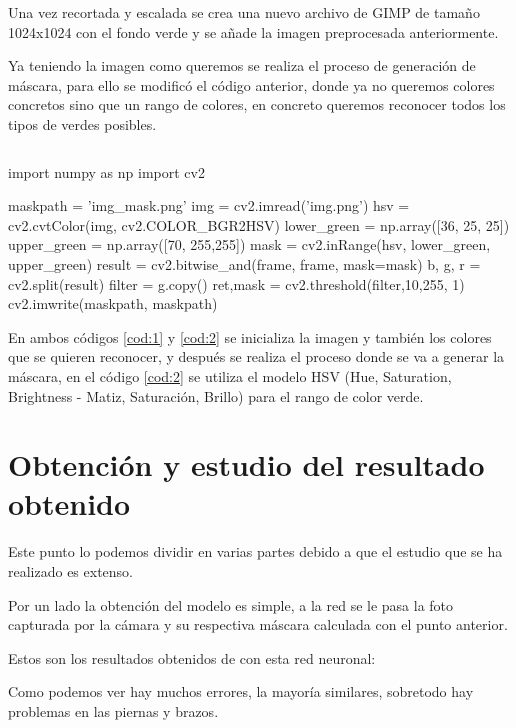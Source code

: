 Una vez recortada y escalada se crea una nuevo archivo de GIMP de tamaño 1024x1024 con el fondo verde y se añade la imagen preprocesada anteriormente.

Ya teniendo la imagen como queremos se realiza el proceso de generación de máscara, para ello se modificó el código anterior, donde ya no queremos colores concretos sino que un rango de colores, en concreto queremos reconocer todos los tipos de verdes posibles.
\pagebreak

\begin{lstlisting}[caption={Código obtención máscara 2}, label=cod:2]
\end{lstlisting}
\begin{python}
	import numpy as np
	import cv2 
	
	maskpath = 'img_mask.png'
	img = cv2.imread('img.png')
	hsv = cv2.cvtColor(img, cv2.COLOR_BGR2HSV)
	lower_green = np.array([36, 25, 25])
	upper_green = np.array([70, 255,255])
	mask = cv2.inRange(hsv, lower_green, upper_green)
	result = cv2.bitwise_and(frame, frame, mask=mask)
	b, g, r = cv2.split(result)
	filter = g.copy()
	ret,mask = cv2.threshold(filter,10,255, 1)
	cv2.imwrite(maskpath, maskpath)
\end{python}

En ambos códigos \ref{cod:1} y \ref{cod:2} se inicializa la imagen y también los colores que se quieren reconocer, y después se realiza el proceso donde se va a generar la máscara, en el código \ref{cod:2} se utiliza el modelo HSV (Hue, Saturation, Brightness - Matiz, Saturación, Brillo) para el rango de color verde.



\section{Obtención y estudio del resultado obtenido}

Este punto lo podemos dividir en varias partes debido a que el estudio que se ha realizado es extenso. 

Por un lado la obtención del modelo es simple, a la red se le pasa la foto capturada por la cámara y  su respectiva máscara calculada con el punto anterior.

Estos son los resultados obtenidos de con esta red neuronal:


Como podemos ver hay muchos errores, la mayoría similares, sobretodo hay problemas en las piernas y brazos.

